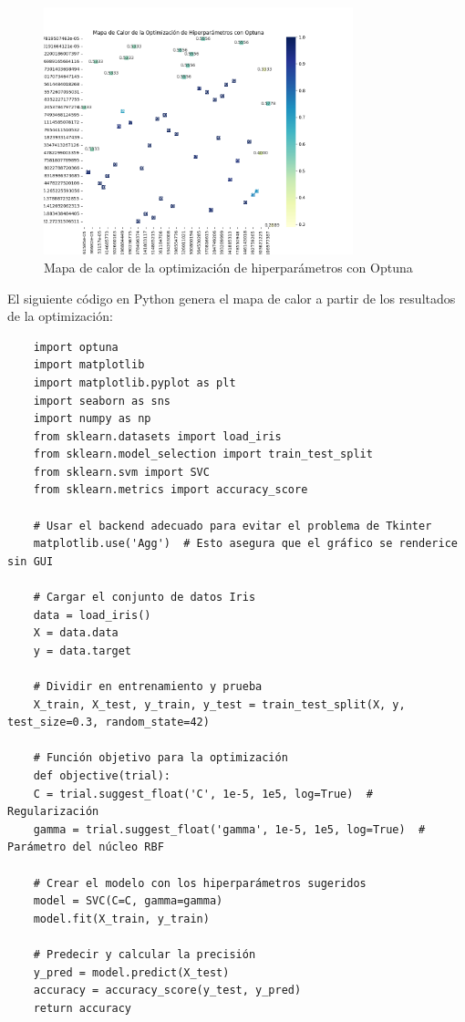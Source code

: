 \documentclass{article}
\begin{document}
{\begin{figure}[H]
	\centering
	\includegraphics[width=0.8\textwidth]{heatmap_optuna.png}
	\caption{Mapa de calor de la optimización de hiperparámetros con Optuna}
	\label{fig:optuna_heatmap}
\end{figure}

El siguiente código en Python genera el mapa de calor a partir de los resultados de la optimización:

\begin{lstlisting}
	import optuna
	import matplotlib
	import matplotlib.pyplot as plt
	import seaborn as sns
	import numpy as np
	from sklearn.datasets import load_iris
	from sklearn.model_selection import train_test_split
	from sklearn.svm import SVC
	from sklearn.metrics import accuracy_score
	
	# Usar el backend adecuado para evitar el problema de Tkinter
	matplotlib.use('Agg')  # Esto asegura que el gráfico se renderice sin GUI
	
	# Cargar el conjunto de datos Iris
	data = load_iris()
	X = data.data
	y = data.target
	
	# Dividir en entrenamiento y prueba
	X_train, X_test, y_train, y_test = train_test_split(X, y, test_size=0.3, random_state=42)
	
	# Función objetivo para la optimización
	def objective(trial):
	C = trial.suggest_float('C', 1e-5, 1e5, log=True)  # Regularización
	gamma = trial.suggest_float('gamma', 1e-5, 1e5, log=True)  # Parámetro del núcleo RBF
	
	# Crear el modelo con los hiperparámetros sugeridos
	model = SVC(C=C, gamma=gamma)
	model.fit(X_train, y_train)
	
	# Predecir y calcular la precisión
	y_pred = model.predict(X_test)
	accuracy = accuracy_score(y_test, y_pred)
	return accuracy
	

\end{lstlisting}}
\end{document}
